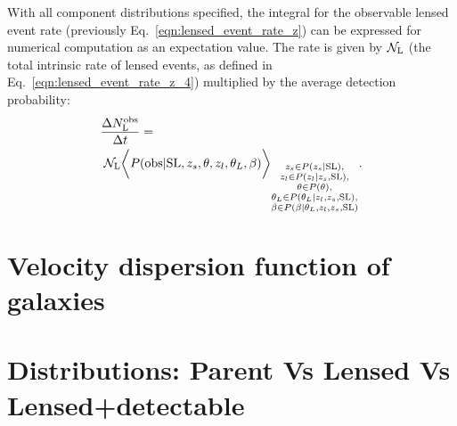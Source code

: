 \documentclass[aps,prd,twocolumn,superscriptaddress,groupedaddress,nofootinbib,showpacs,eqsecnum]{revtex4-1}
\begin{document}
With all component distributions specified, the integral for the observable lensed event rate (previously Eq.~\ref{eqn:lensed_event_rate_z}) can be expressed for numerical computation as an expectation value. The rate is given by ${\cal N}_{\rm L}$ (the total intrinsic rate of lensed events, as defined in Eq.~\ref{eqn:lensed_event_rate_z_4}) multiplied by the average detection probability:
\begin{align}
&\frac{\Delta N^{\rm obs}_{\rm L}}{\Delta t} =\notag \\
&\; {\cal N}_{\rm L} \bigg\langle P({\rm obs}|{\rm SL}, z_s, \theta, z_l, \theta_L, \beta) \bigg\rangle_{\substack{
z_s \in P(z_s|{\rm SL}), \\
z_l \in P(z_l|z_s, {\rm SL}), \\
\theta \in P(\theta), \\
\theta_L \in P(\theta_L|z_l, z_s, {\rm SL}), \\
\beta \in P(\beta|\theta_L, z_l, z_s, {\rm SL})
}}.
\label{eqn:lensed_event_rate_z_5}
\end{align}






\section{Velocity dispersion function of galaxies}\label{sec:sigma_distribution}

\section{Distributions: Parent Vs Lensed Vs Lensed+detectable}\label{sec:}


\newpage



\end{document}
